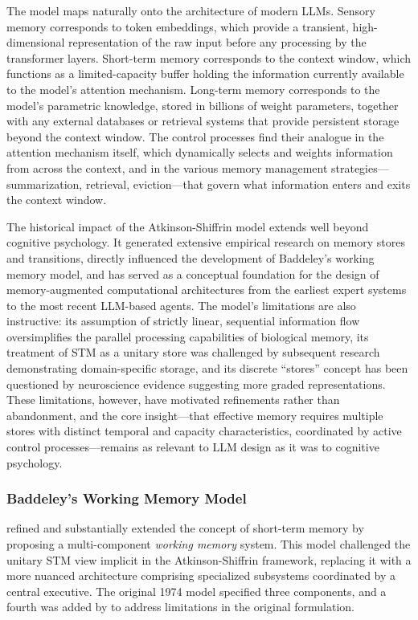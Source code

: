 The model maps naturally onto the architecture of modern LLMs. Sensory memory corresponds to token embeddings, which provide a transient, high-dimensional representation of the raw input before any processing by the transformer layers. Short-term memory corresponds to the context window, which functions as a limited-capacity buffer holding the information currently available to the model's attention mechanism. Long-term memory corresponds to the model's parametric knowledge, stored in billions of weight parameters, together with any external databases or retrieval systems that provide persistent storage beyond the context window. The control processes find their analogue in the attention mechanism itself, which dynamically selects and weights information from across the context, and in the various memory management strategies---summarization, retrieval, eviction---that govern what information enters and exits the context window.

The historical impact of the Atkinson-Shiffrin model extends well beyond cognitive psychology. It generated extensive empirical research on memory stores and transitions, directly influenced the development of Baddeley's working memory model, and has served as a conceptual foundation for the design of memory-augmented computational architectures from the earliest expert systems to the most recent LLM-based agents. The model's limitations are also instructive: its assumption of strictly linear, sequential information flow oversimplifies the parallel processing capabilities of biological memory, its treatment of STM as a unitary store was challenged by subsequent research demonstrating domain-specific storage, and its discrete ``stores'' concept has been questioned by neuroscience evidence suggesting more graded representations. These limitations, however, have motivated refinements rather than abandonment, and the core insight---that effective memory requires multiple stores with distinct temporal and capacity characteristics, coordinated by active control processes---remains as relevant to LLM design as it was to cognitive psychology.

\subsubsection{Baddeley's Working Memory Model}

\citet{baddeley1974working} refined and substantially extended the concept of short-term memory by proposing a multi-component \emph{working memory} system. This model challenged the unitary STM view implicit in the Atkinson-Shiffrin framework, replacing it with a more nuanced architecture comprising specialized subsystems coordinated by a central executive. The original 1974 model specified three components, and a fourth was added by \citet{baddeley2000episodic} to address limitations in the original formulation.


